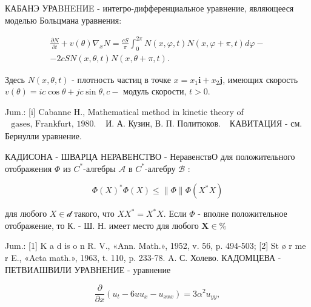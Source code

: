 \documentclass[10pt]{article}
\begin{document}
КАБАНЭ УРАBHEHИE - интегро-дифференциальное уравнение, являющееся моделью Больцмана уравнения:



\[

\begin{gathered}

\frac{\partial N}{\partial t}+v(\theta) \nabla_{x} N=\frac{c S}{\pi} \int_{0}^{2 \pi} N(x, \varphi, t) N(x, \varphi+\pi, t) d \varphi- \\

-2 c S N(x, \theta, t) N(x, \theta+\pi, t) .

\end{gathered}

\]



Здесь $N(x, \theta, t)$ - плотность частиц в точке $x=x_{1} \boldsymbol{i}+x_{2} \boldsymbol{j}$, имеющих скорость $v(\theta)=i c \cos \theta+j c \sin \theta, c-$ модуль скорости, $t>0$.



Jum.: [i] Cabanne H., Mathematical method in kinetic theory of $\begin{array}{ll}\text { gases, Frankfurt, } 1980 . & \text { И. А. Кузин, В. П. Политюков. }\end{array}$ КАВИТАЦИЯ - см. Бернулли уравнение.



КАДИСОНА - ШВАРЦА НЕРАВЕНСТВО - НеравенствО для положительного отображения $\Phi$ из $C^{*}$-алгебры $\mathscr{A}$ в $C^{*}$-алгебру $\mathscr{B}$ :



\[

\Phi(X)^{*} \Phi(X) \leqslant\|\Phi\| \Phi\left(X^{*} X\right)

\]



для любого $X \in \mathscr{d}$ такого, что $X X^{*}=X^{*} X$. Если $\Phi$ - вполне положительное отображение, то К. - Ш. Н. имеет место для любого $\boldsymbol{X} \in \%$



Jum.: [1] K a d is o n R. V., «Ann. Math.», 1952, v. 56, p. 494-503; [2] St ø r me r E., «Acta math.», 1963, t. 110, p. 233-78. A. С. Холево. КАДОМЦЕВА - ПЕТВИАШВИЛИ УРАВНЕНИЕ - уравнение



\[

\frac{\partial}{\partial x}\left(u_{t}-6 u u_{x}-u_{x x x}\right)=3 \alpha^{2} u_{y y},

\]
\end{document}
